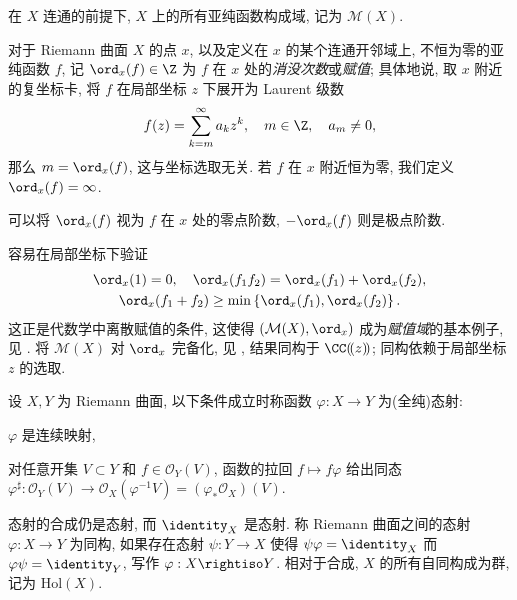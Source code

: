 \begin{definition}\label{def:meromorphic-function-field}
	在 $X$ 连通的前提下, $X$ 上的所有亚纯函数构成域, 记为 $\mathcal{M}(X)$.
\end{definition}

\begin{definition}\label{def:vanishing-order}  
	对于 Riemann 曲面 $X$ 的点 $x$, 以及定义在 $x$ 的某个连通开邻域上, 不恒为零的亚纯函数 $f$, 记 $\ord_x(f) \in \Z$ 为 $f$ 在 $x$ 处的\emph{消没次数}或\emph{赋值}; 具体地说, 取 $x$ 附近的复坐标卡, 将 $f$ 在局部坐标 $z$ 下展开为 Laurent 级数
	\[ f(z) = \sum_{k=m}^\infty a_k z^k, \quad m \in \Z, \quad a_m \neq 0, \]
	那么 $m = \ord_x(f)$, 这与坐标选取无关. 若 $f$ 在 $x$ 附近恒为零, 我们定义 $\ord_x(f) = \infty$.
\end{definition}

可以将 $\ord_x(f)$ 视为 $f$ 在 $x$ 处的零点阶数, $-\ord_x(f)$ 则是极点阶数.

\begin{remark}
	容易在局部坐标下验证
	\begin{equation*}\begin{gathered}
		\ord_x(1) = 0, \quad \ord_x(f_1 f_2) = \ord_x(f_1) + \ord_x(f_2), \\
		\ord_x(f_1 + f_2) \geq \min\left\{ \ord_x(f_1), \ord_x(f_2) \right\}.
	\end{gathered}\end{equation*}
	这正是代数学中离散赋值的条件, 这使得 $\left(\mathcal{M}(X), \ord_x\right)$ 成为\emph{赋值域}的基本例子, 见 \cite[\S 10.3]{Li1}. 将 $\mathcal{M}(X)$ 对 $\ord_x$ 完备化, 见 \cite[\S 10.2]{Li1}, 结果同构于 $\CC(\!(z)\!)$; 同构依赖于局部坐标 $z$ 的选取.
\end{remark}

\begin{definition}
	设 $X, Y$ 为 Riemann 曲面, 以下条件成立时称函数 $\varphi: X \to Y$ 为(全纯)态射:
	\begin{compactitem}
		\item $\varphi$ 是连续映射,
		\item 对任意开集 $V \subset Y$ 和 $f \in \mathscr{O}_Y(V)$, 函数的拉回 $f \mapsto f \varphi$ 给出同态 $\varphi^\sharp: \mathscr{O}_Y(V) \to \mathscr{O}_X(\varphi^{-1}V) = (\varphi_* \mathcal{O}_X)(V)$.
	\end{compactitem}
\end{definition}

态射的合成仍是态射, 而 $\identity_X$ 是态射. 称 Riemann 曲面之间的态射 $\varphi: X \to Y$ 为同构, 如果存在态射 $\psi: Y \to X$ 使得 $\psi \varphi = \identity_X$ 而 $\varphi \psi = \identity_Y$, 写作 $\varphi: X \rightiso Y$. 相对于合成, $X$ 的所有自同构成为群, 记为 $\mathrm{Hol}(X)$. 

